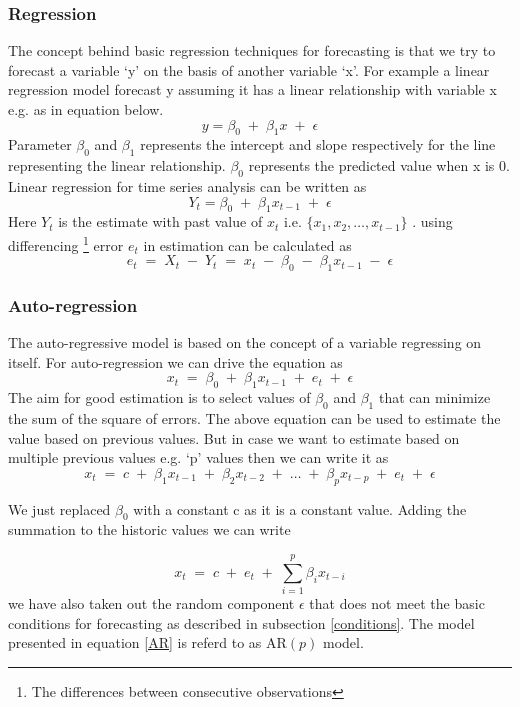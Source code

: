  \subsubsection{Regression}The concept behind basic regression techniques for forecasting is that we try to forecast a variable `y' on the basis of another variable `x'. For example a linear regression model forecast y assuming it has a linear relationship with  variable x e.g. as in equation below.
 $$ y = \beta_{0}\;+\;\beta_{1}x\;+\;\epsilon $$
 Parameter \(\beta_0\) and \(\beta_1\) represents the intercept and slope respectively for the line representing  the linear relationship. \(\beta_0\) represents the predicted value when x is 0. Linear regression for time series analysis can be written as 
 $$ Y_{t} = \beta_{0}\;+\;\beta_{1}x_{t-1}\;+\;\epsilon $$
 Here \(Y_{t}\) is the estimate with past value of \(x_{t}\) i.e. \(\{x_1,x_2,\dotsc, x_{t-1}\}\) . using differencing \footnote{The differences between consecutive observations} error \(e_{t}\) in estimation can be calculated as
 \begin{equation}
 e_{t}\;=\; X_{t}\; -\; Y_{t}\;=\; x_{t}\; -\;\beta_{0}\;-\;\beta_{1}x_{t-1}\;-\;\epsilon
 \end{equation}
 \subsubsection{Auto-regression}  
 The auto-regressive model is based on the concept of a variable regressing on itself. For auto-regression we can drive the equation as
  \begin{equation}
  x_{t}\; =\;\beta_{0}\;+\;\beta_{1}x_{t-1}\;+\;e_{t}\;+\;\epsilon
  \end{equation} 
  The aim for good estimation is to select values of \(\beta_0\) and \(\beta_1\) that can minimize the sum of the square of errors. The above equation can be used to estimate the value based on previous values. But in case we want to estimate based on multiple previous values e.g. `p' values then we can write it as 
 \begin{equation} \label{AR}
  x_{t}\; =\;c\;+\;\beta_{1}x_{t-1}\;+\;\beta_{2}x_{t-2}\;+\;\dotsc\;+\;\beta_{p}x_{t-p}\;+\;e_{t}\;+\;\epsilon
 \end{equation}
 
 We just replaced \(\beta_0\) with a constant c as it is a constant value. Adding the summation to the historic values we can write 
 
$$
x_{t}\; =\;c\;+\;e_{t}\;+\;\sum\limits_{i=1}^p\beta_{i}x_{t-i}
$$
we have also taken out the random component \(\epsilon\) that does  not meet the basic conditions for forecasting as described in subsection \ref{conditions}. The model presented  in equation \ref{AR} is referd to as AR\((p)\) model. 

